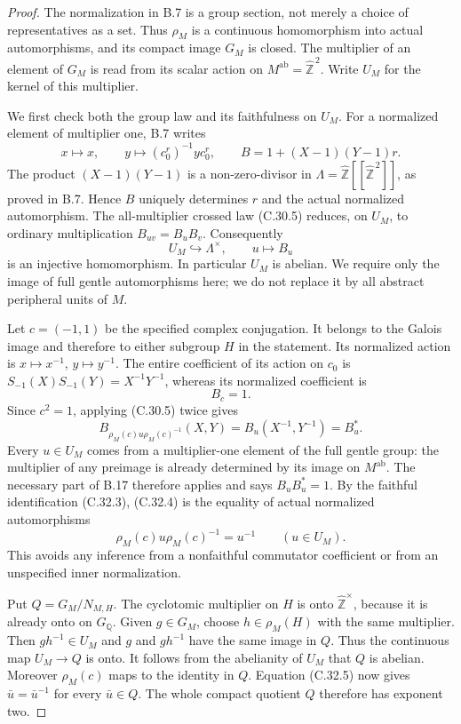 \begin{proof}
The normalization in B.7 is a group section, not merely a choice
of representatives as a set. Thus $\rho_M$ is a continuous
homomorphism into actual automorphisms, and its compact image
$G_M$ is closed. The multiplier of an element of $G_M$ is read
from its scalar action on
$M^{\mathrm{ab}}=\widehat{\mathbb Z}^{\,2}$.
Write $U_M$ for the kernel of this multiplier.

We first check both the group law and its faithfulness on $U_M$.
For a normalized element of multiplier one, B.7 writes
\[
 x\longmapsto x,\qquad
 y\longmapsto(c_0^r)^{-1}y c_0^r,\qquad
 B=1+(X-1)(Y-1)r .
 \tag{C.32.2}
\]
The product $(X-1)(Y-1)$ is a non-zero-divisor in
$\Lambda=\widehat{\mathbb Z}[[\widehat{\mathbb Z}^{\,2}]]$,
as proved in B.7. Hence $B$ uniquely determines $r$ and the
actual normalized automorphism. The all-multiplier crossed law
(C.30.5) reduces, on $U_M$, to ordinary multiplication
$B_{uv}=B_uB_v$. Consequently
\[
                   U_M\hookrightarrow\Lambda^\times,\qquad
                   u\longmapsto B_u
                   \tag{C.32.3}
\]
is an injective homomorphism. In particular $U_M$ is abelian.
We require only the image of full gentle automorphisms here;
we do not replace it by all abstract peripheral units of $M$.

Let $c=(-1,1)$ be the specified complex conjugation. It belongs
to the Galois image and therefore to either subgroup $H$ in the
statement. Its normalized action is
$x\mapsto x^{-1}$, $y\mapsto y^{-1}$.
The entire coefficient of its action on $c_0$ is
$S_{-1}(X)S_{-1}(Y)=X^{-1}Y^{-1}$, whereas its normalized
coefficient is
\[
                         B_c=1.
\]
Since $c^2=1$, applying (C.30.5) twice gives
\[
 B_{\rho_M(c)u\rho_M(c)^{-1}}(X,Y)
                    =B_u(X^{-1},Y^{-1})=B_u^*.
 \tag{C.32.4}
\]
Every $u\in U_M$ comes from a multiplier-one element of the
full gentle group: the multiplier of any preimage is already
determined by its image on $M^{\mathrm{ab}}$.
The necessary part of B.17 therefore applies and says
$B_uB_u^*=1$. By the faithful identification (C.32.3),
(C.32.4) is the equality of actual normalized automorphisms
\[
               \rho_M(c)u\rho_M(c)^{-1}=u^{-1}
                         \qquad(u\in U_M).
 \tag{C.32.5}
\]
This avoids any inference from a nonfaithful commutator
coefficient or from an unspecified inner normalization.

Put $Q=G_M/N_{M,H}$. The cyclotomic multiplier on $H$ is onto
$\widehat{\mathbb Z}^{\times}$, because it is already onto
on $G_{\mathbb Q}$. Given $g\in G_M$, choose $h\in\rho_M(H)$
with the same multiplier. Then $gh^{-1}\in U_M$ and $g$ and
$gh^{-1}$ have the same image in $Q$. Thus the continuous
map $U_M\to Q$ is onto. It follows from the abelianity of
$U_M$ that $Q$ is abelian. Moreover $\rho_M(c)$ maps to
the identity in $Q$. Equation (C.32.5) now gives
$\bar u=\bar u^{-1}$ for every $\bar u\in Q$.
The whole compact quotient $Q$ therefore has exponent two.


\end{proof}
